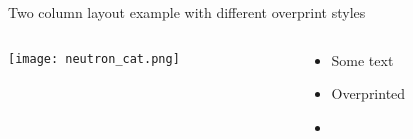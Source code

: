 \documentclass[talk.tex]{subfiles}
\begin{document}
    \begin{frame}{Two column layout example with different overprint styles}
	\begin{columns}
	    \begin{column}[T]{0.7\textwidth}
		\texttt{[image: neutron\_cat.png]}
	    \end{column}
	    \begin{column}[T]{0.3\textwidth}
		\begin{overprint}
		    \begin{itemize}
			\item Some text
		    \end{itemize}
		    \begin{itemize}
			\item Overprinted
		    \end{itemize}
		\end{overprint}
		\begin{itemize}
		    \item{}
		\end{itemize}
	    \end{column}
	\end{columns}
    \end{frame}
\end{document}
